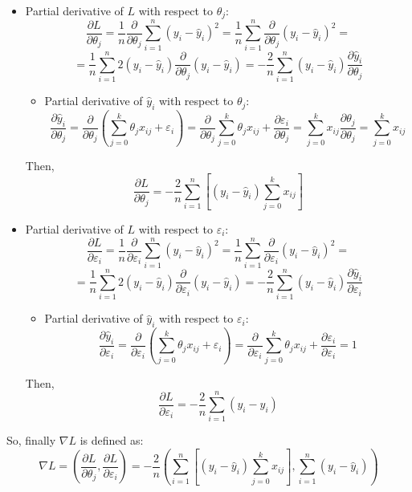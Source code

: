\documentclass{article}
\begin{document}
\begin{itemize}
    \item Partial derivative of $L$ with respect to $\theta_j$:
    $$\frac{\partial L}{\partial \theta_j} = \frac{1}{n} \frac{\partial}{\partial \theta_j} \sum^{n}_{i=1}\left(y_i - \hat{y}_i \right)^2 = \frac{1}{n} \sum^{n}_{i=1} \frac{\partial}{\partial \theta_j} \left(y_i - \hat{y}_i \right)^2= $$
    $$= \frac{1}{n} \sum^{n}_{i=1} 2\left(y_i - \hat{y}_i \right)\frac{\partial}{\partial \theta_j} \left(y_i - \hat{y}_i \right) = - \frac{2}{n} \sum^{n}_{i=1} \left(y_i - \hat{y}_i \right)\frac{\partial \hat{y}_i}{\partial \theta_j}$$
    \begin{itemize}
        \item Partial derivative of $\hat{y}_i$ with respect to $\theta_j$:
        $$\frac{\partial \hat{y}_i}{\partial \theta_j} = \frac{\partial}{\partial \theta_j}\left( \sum^{k}_{j=0}\theta_j x_{ij} + \varepsilon_i \right) = \frac{\partial}{\partial \theta_j} \sum^{k}_{j=0}\theta_j x_{ij} + \frac{\partial \varepsilon_i}{\partial \theta_j}=\sum^{k}_{j=0} x_{ij} \frac{\partial \theta_j}{\partial \theta_j} = \sum^{k}_{j=0}x_{ij}$$
    \end{itemize}
    Then,
    \begin{equation}
    \boxed{\frac{\partial L}{\partial \theta_j} = - \frac{2}{n} \sum^{n}_{i=1} \left[ \left(y_i - \hat{y}_i \right)\sum^{k}_{j=0}x_{ij} \right]}
    \end{equation}
    \item Partial derivative of $L$ with respect to $\varepsilon_i$:
    $$\frac{\partial L}{\partial \varepsilon_i} = \frac{1}{n} \frac{\partial}{\partial \varepsilon_i} \sum^{n}_{i=1}\left(y_i - \hat{y}_i \right)^2 = \frac{1}{n} \sum^{n}_{i=1} \frac{\partial}{\partial \varepsilon_i} \left(y_i - \hat{y}_i \right)^2= $$
    $$= \frac{1}{n} \sum^{n}_{i=1} 2\left(y_i - \hat{y}_i \right)\frac{\partial}{\partial \varepsilon_i} \left(y_i - \hat{y}_i \right) = - \frac{2}{n} \sum^{n}_{i=1} \left(y_i - \hat{y}_i \right)\frac{\partial \hat{y}_i}{\partial \varepsilon_i}$$
    \begin{itemize}
        \item Partial derivative of $\hat{y}_i$ with respect to $\varepsilon_i$:
        $$\frac{\partial \hat{y}_i}{\partial \varepsilon_i} = \frac{\partial}{\partial \varepsilon_i}\left( \sum^{k}_{j=0}\theta_j x_{ij} + \varepsilon_i \right) = \frac{\partial}{\partial \varepsilon_i} \sum^{k}_{j=0}\theta_j x_{ij} + \frac{\partial \varepsilon_i}{\partial \varepsilon_i} = 1$$
    \end{itemize}
    Then,
    \begin{equation}
    \boxed{\frac{\partial L}{\partial \varepsilon_i} = - \frac{2}{n} \sum^{n}_{i=1} \left(y_i - \hat{y}_i \right)}
    \end{equation}
\end{itemize}
So, finally $\nabla L$ is defined as:
$$\nabla L = \left( \frac{\partial L}{\partial \theta_j}, \frac{\partial L}{\partial \varepsilon_i}\right)= - \frac{2}{n}\left(  \sum^{n}_{i=1} \left[ \left(y_i - \hat{y}_i \right)\sum^{k}_{j=0}x_{ij} \right], \sum^{n}_{i=1} \left(y_i - \hat{y}_i \right)\right)$$
\end{document}
